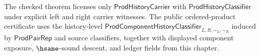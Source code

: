 \begin{corollary}
\label{cor:prod-history-envelope-licensed-not-primitive}
The checked theorem licenses only $\mathsf{ProdHistoryCarrier}$ with
$\mathsf{ProdHistoryClassifier}$ under explicit left and right carrier
witnesses. The public ordered-product certificate uses the history-level
$\mathsf{ProdComponentHistoryClassifier}_{L,R,\sim_L,\sim_R}$ induced by
$\mathsf{ProdPairRep}$ and source classifiers, together with displayed
component exposure, $\hsame$-sound descent, and ledger fields from this chapter.
\end{corollary}
